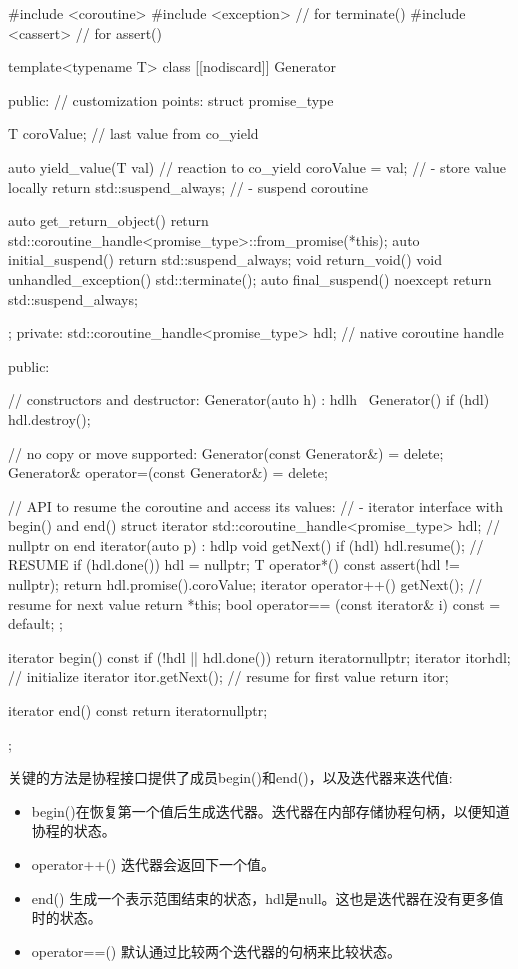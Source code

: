 \begin{cpp}
#include <coroutine>
#include <exception> // for terminate()
#include <cassert> // for assert()

template<typename T>
class [[nodiscard]] Generator {
	public:
	// customization points:
	struct promise_type {
		T coroValue{}; // last value from co_yield

		auto yield_value(T val) { // reaction to co_yield
			coroValue = val; // - store value locally
			return std::suspend_always{}; // - suspend coroutine
		}

		auto get_return_object() {
			return std::coroutine_handle<promise_type>::from_promise(*this);
		}
		auto initial_suspend() { return std::suspend_always{}; }
		void return_void() { }
		void unhandled_exception() { std::terminate(); }
		auto final_suspend() noexcept { return std::suspend_always{}; }
	};
private:
	std::coroutine_handle<promise_type> hdl; // native coroutine handle

public:

	// constructors and destructor:
	Generator(auto h) : hdl{h} { }
	~Generator() { if (hdl) hdl.destroy(); }

	// no copy or move supported:
	Generator(const Generator&) = delete;
	Generator& operator=(const Generator&) = delete;

	// API to resume the coroutine and access its values:
	// - iterator interface with begin() and end()
	struct iterator {
		std::coroutine_handle<promise_type> hdl; // nullptr on end
		iterator(auto p) : hdl{p} {
		}
		void getNext() {
			if (hdl) {
				hdl.resume(); // RESUME
				if (hdl.done()) {
					hdl = nullptr;
				}
			}
		}
		T operator*() const {
			assert(hdl != nullptr);
			return hdl.promise().coroValue;
		}
		iterator operator++() {
			getNext(); // resume for next value
			return *this;
		}
		bool operator== (const iterator& i) const = default;
	};

	iterator begin() const {
		if (!hdl || hdl.done()) {
			return iterator{nullptr};
		}
		iterator itor{hdl}; // initialize iterator
		itor.getNext(); // resume for first value
		return itor;
	}

	iterator end() const {
		return iterator{nullptr};
	}
};
\end{cpp}

关键的方法是协程接口提供了成员begin()和end()，以及迭代器来迭代值:

\begin{itemize}
\item
begin()在恢复第一个值后生成迭代器。迭代器在内部存储协程句柄，以便知道协程的状态。

\item
operator++() 迭代器会返回下一个值。

\item
end() 生成一个表示范围结束的状态，hdl是null。这也是迭代器在没有更多值时的状态。

\item
operator==() 默认通过比较两个迭代器的句柄来比较状态。
\end{itemize}

